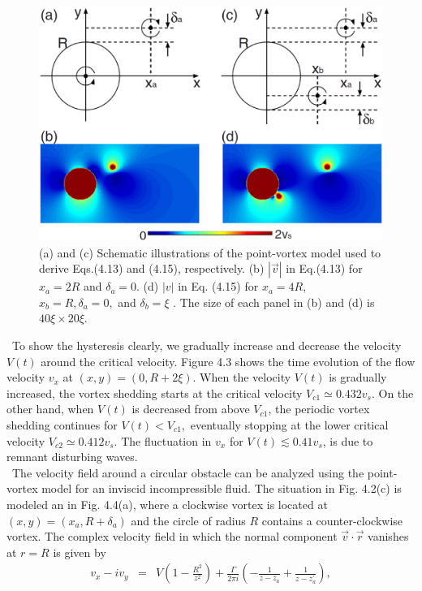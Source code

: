 \documentclass[12pt,a4paper]{report}
\begin{document}
\begin{figure}[htbp]
\begin{center}
\includegraphics[scale=0.30, keepaspectratio]{4-4.eps}
\caption{
(a) and (c) Schematic illustrations of the point-vortex
model used to derive Eqs.(4.13) and (4.15), respectively. (b) $|\vec{v}|$
in Eq.(4.13) for $x_a = 2R$ and $\delta_a = 0$. (d) $|v|$ in Eq. (4.15) for $x_a = 4R$,
$x_b = R, \delta_a = 0,$ and $\delta_b = \xi$ . The size of each panel in (b) and (d) is
$40 \xi \times 20 \xi$.
}
\label{FIG:4-4}
\end{center}
\end{figure}
\ To show the hysteresis clearly, we gradually increase
and decrease the velocity $V(t)$ around the critical
velocity. Figure 4.3 shows the time evolution of the flow 
velocity $v_x$ at $(x,y) = (0, R+2\xi)$. When the velocity $V(t)$
is gradually increased, the vortex shedding starts at the critical
velocity $V_{c1} \simeq 0.432 v_s$. On the other hand, when $V(t)$
is decreased from above $V_{c1}$, the periodic vortex shedding
continues for $V(t) < V_{c1},$ eventually stopping at the
lower critical velocity $V_{c2} \simeq 0.412 v_s$. The fluctuation
in $v_x$ for $V(t) \lesssim 0.41 v_s$, is due to remnant disturbing
waves.
\\
\ The velocity field around a circular obstacle can be
analyzed using the point-vortex model for an inviscid 
incompressible fluid. The situation in Fig. 4.2(c) is modeled
an in Fig. 4.4(a), where a clockwise vortex is located at
$(x,y)=(x_a, R+\delta_a)$ and the circle of radius $R$
contains a counter-clockwise vortex. The complex velocity
field in which the normal component $\vec{v} \cdot \vec{r}$
vanishes at $r = R$ is given by
\begin{eqnarray}
v_x - iv_y & = &
V \left( 1 - \frac{R^2}{z^2} \right)
+ \frac{\Gamma}{2 \pi i}
\left( - \frac{1}{z - z_a} + \frac{1}{z - z^\prime_a} \right),
\end{eqnarray}
\end{document}

